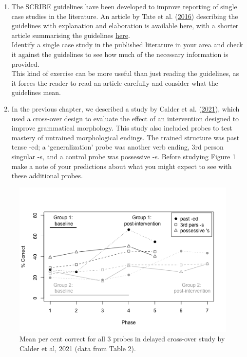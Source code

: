 \documentclass{krantz}
\begin{document}
\begin{enumerate}
\def\labelenumi{\arabic{enumi}.}
\setcounter{enumi}{1}
\item
  The SCRIBE guidelines have been developed to improve reporting of single case studies in the literature. An article by Tate et al. (\protect\hyperlink{ref-tate2016}{2016}) describing the guidelines with explanation and elaboration is available \href{https://psycnet.apa.org/fulltext/2016-17382-001.html}{here}, with a shorter article summarising the guidelines \href{https://academic.oup.com/ptj/article/96/7/e1/2864911}{here}.\\
  Identify a single case study in the published literature in your area and check it against the guidelines to see how much of the necessary information is provided.\\
  This kind of exercise can be more useful than just reading the guidelines, as it forces the reader to read an article carefully and consider what the guidelines mean.
\item
  In the previous chapter, we described a study by Calder et al. (\protect\hyperlink{ref-calder2021}{2021}), which used a cross-over design to evaluate the effect of an intervention designed to improve grammatical morphology. This study also included probes to test mastery of untrained morphological endings. The trained structure was past tense -ed; a `generalization' probe was another verb ending, 3rd person singular -s, and a control probe was possessive -s. Before studying Figure \ref{fig:Calderplus} make a note of your predictions about what you might expect to see with these additional probes.
\end{enumerate}

\begin{figure}
\includegraphics[width=0.85\linewidth]{images_bw/calderfig-2} \caption{Mean per cent correct for all 3 probes in delayed cross-over study by Calder et al, 2021 (data from Table 2).}\label{fig:Calderplus}
\end{figure}
\end{document}
